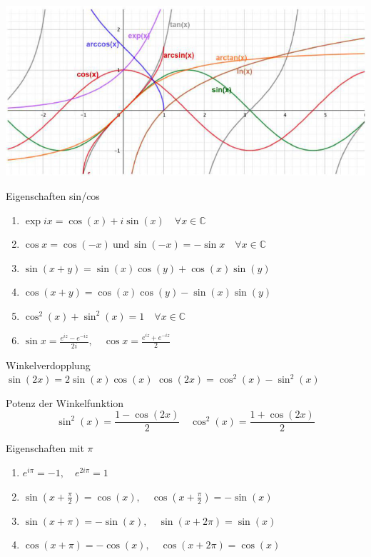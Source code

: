 \begin{center}
    \includegraphics[width=0.8\linewidth]{images/trigonometrische_funktionen.png}
\end{center}



\begin{theorem}{Eigenschaften sin/cos}
    \begin{enumerate}
        \item $\exp ix = \cos(x) + i \sin(x) \quad \forall x \in \mathbb{C}$
        \item $\cos x = \cos(-x) ~\text{und}~ \sin(-x) = -\sin x \quad\forall x \in \mathbb{C}$
        \item $\sin(x + y) = \sin(x)\cos(y) + \cos(x)\sin(y)$
        \item $\cos(x + y) = \cos(x)\cos(y) - \sin(x)\sin(y)$
        \item $\cos^2(x) + \sin^2(x) = 1 \quad \forall x \in \mathbb{C}$ 
        \item $\sin x = \frac{e^{iz} - e^{-iz}}{2i}, \quad \cos x = \frac{e^{iz} + e^{-iz}}{2}$
    \end{enumerate} 
 \end{theorem}
 
 \begin{corollary}{Winkelverdopplung}\\
         $\sin(2x) = 2 \sin(x)\cos(x)$ \hspace{4mm} $\cos(2x) = \cos^2(x) - \sin^2(x)$
 \end{corollary}
 \begin{corollary}{Potenz der Winkelfunktion}\\
    $$\sin^2(x) = \frac{1 - \cos(2x)}{2} \quad \cos^2(x) = \frac{1 + \cos(2x)}{2}$$
 \end{corollary}
 \begin{corollary}{Eigenschaften mit $\pi$}
     \begin{enumerate}[itemsep= 2pt]
         \item $e^{i\pi} = -1, \quad e^{2i\pi} = 1$
         \item $\sin\left(x + \frac{\pi}{2}\right) = \cos(x), \quad \cos\left(x + \frac{\pi}{2}\right) = -\sin(x)$
         \item $\sin(x+\pi) = -\sin (x), \quad \sin(x + 2\pi) = \sin(x)$
         \item $\cos(x+\pi) = -\cos (x), \quad \cos(x + 2\pi) = \cos(x)$
     \end{enumerate}
 \end{corollary}

